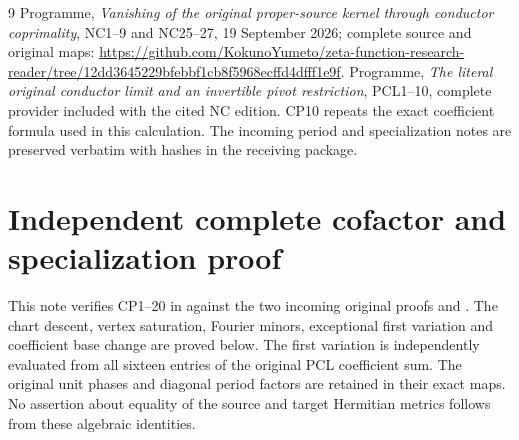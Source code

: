 \begin{thebibliography}{9}
 Programme, \emph{Vanishing of the original proper-source
kernel through conductor coprimality}, NC1--9 and NC25--27,
19 September 2026; complete source and original maps:
\url{https://github.com/KokunoYumeto/zeta-function-research-reader/tree/12dd3645229bfebbf1cb8f5968ecffd4dfff1e9f}.
 Programme, \emph{The literal original conductor limit
and an invertible pivot restriction}, PCL1--10, complete provider
included with the cited NC edition. CP10 repeats the exact coefficient
formula used in this calculation. The incoming period and specialization
notes are preserved verbatim with hashes in the receiving package.
\end{thebibliography}

\endgroup

\clearpage\begingroup
\part*{Independent complete cofactor and specialization proof}
\newcommand{\pindcoC}{\mathbb C}
\newcommand{\pindcoim}{\operatorname{im}}
\newcommand{\pindcoSpec}{\operatorname{Spec}}
\newcommand{\pindcodiag}{\operatorname{diag}}
\newcommand{\pindcorank}{\operatorname{rank}}



This note verifies CP1--20 in
 against the two
incoming original proofs 
and . The chart descent,
vertex saturation, Fourier minors, exceptional first variation and
coefficient base change are proved below.  The first variation is
independently evaluated from all sixteen entries of the original PCL
coefficient sum.  The original unit phases and diagonal period factors
are retained in their exact maps.  No assertion about equality of
the source and target Hermitian metrics follows from these algebraic
identities.

